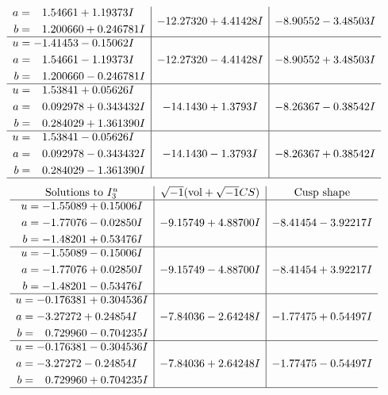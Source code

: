 \documentclass[1p]{elsarticle_modified}
\theoremstyle{definition}
\newcommand{\I}{\sqrt{-1}}
\begin{document}
$$\begin{array}{c|c|c}
\begin{aligned}
a &= \phantom{-}1.54661 + 1.19373 I \\
b &= \phantom{-}1.200660 + 0.246781 I\end{aligned}
 & -12.27320 + 4.41428 I & -8.90552 - 3.48503 I \\ \hline\begin{aligned}
u &= -1.41453 - 0.15062 I \\
a &= \phantom{-}1.54661 - 1.19373 I \\
b &= \phantom{-}1.200660 - 0.246781 I\end{aligned}
 & -12.27320 - 4.41428 I & -8.90552 + 3.48503 I \\ \hline\begin{aligned}
u &= \phantom{-}1.53841 + 0.05626 I \\
a &= \phantom{-}0.092978 + 0.343432 I \\
b &= \phantom{-}0.284029 + 1.361390 I\end{aligned}
 & -14.1430 + 1.3793 I & -8.26367 - 0.38542 I \\ \hline\begin{aligned}
u &= \phantom{-}1.53841 - 0.05626 I \\
a &= \phantom{-}0.092978 - 0.343432 I \\
b &= \phantom{-}0.284029 - 1.361390 I\end{aligned}
 & -14.1430 - 1.3793 I & -8.26367 + 0.38542 I\\
 \hline 
 \end{array}$$\newpage$$\begin{array}{c|c|c}  
\text{Solutions to }I^u_{3}& \I (\text{vol} + \sqrt{-1}CS) & \text{Cusp shape}\\
 \hline 
\begin{aligned}
u &= -1.55089 + 0.15006 I \\
a &= -1.77076 - 0.02850 I \\
b &= -1.48201 + 0.53476 I\end{aligned}
 & -9.15749 + 4.88700 I & -8.41454 - 3.92217 I \\ \hline\begin{aligned}
u &= -1.55089 - 0.15006 I \\
a &= -1.77076 + 0.02850 I \\
b &= -1.48201 - 0.53476 I\end{aligned}
 & -9.15749 - 4.88700 I & -8.41454 + 3.92217 I \\ \hline\begin{aligned}
u &= -0.176381 + 0.304536 I \\
a &= -3.27272 + 0.24854 I \\
b &= \phantom{-}0.729960 - 0.704235 I\end{aligned}
 & -7.84036 - 2.64248 I & -1.77475 + 0.54497 I \\ \hline\begin{aligned}
u &= -0.176381 - 0.304536 I \\
a &= -3.27272 - 0.24854 I \\
b &= \phantom{-}0.729960 + 0.704235 I\end{aligned}
 & -7.84036 + 2.64248 I & -1.77475 - 0.54497 I\\
 \hline 
 \end{array}$$\newpage
\end{document}
